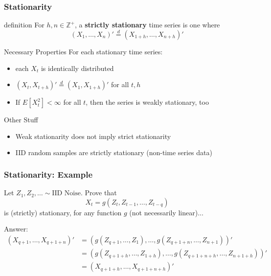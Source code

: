 \documentclass{beamer}
\begin{document}

\begin{frame}
\frametitle{Stationarity}

\begin{block}{definition}
For $h,n \in \mathbb{Z}^+$, a {\bf strictly stationary} time series is one where
\[
(X_1, \ldots, X_{n})' \overset{d}{=} (X_{1+h}, \ldots, X_{n+h})'
\]
\end{block}

\begin{block}{Necessary Properties}
For each stationary time series:
\begin{itemize}
\item each $X_t$ is identically distributed
\item $(X_t,X_{t+h})' \overset{d}{=} (X_1,X_{1+h})'$ for all $t,h$
\item If $E[X_t^2] < \infty$ for all $t$, then the series is weakly stationary, too
\end{itemize}
\end{block}

\begin{block}{Other Stuff}
\begin{itemize}
\item Weak stationarity does not imply strict stationarity
\item IID random samples are strictly stationary (non-time series data)
\end{itemize}
\end{block}



\end{frame}


\begin{frame}
\frametitle{Stationarity: Example}

Let $Z_1, Z_2, \ldots \sim \text{IID Noise}$. Prove that
\[
X_t = g(Z_t, Z_{t-1},\ldots, Z_{t-q})
\]
is (strictly) stationary, for any function $g$ (not necessarily linear)...
\newline
\pause

Answer:
\begin{align*}
(X_{q+1}, \ldots, X_{q+1+n})' &= (g(Z_{q+1},\ldots, Z_{1}), \ldots, g(Z_{q+1+n},\ldots, Z_{n+1}))'\\
&= (g(Z_{q+1+h},\ldots, Z_{1+h}), \ldots, g(Z_{q+1+n+h},\ldots, Z_{n+1+h}))' \\
&= (X_{q+1+h}, \ldots, X_{q+1+n+h})'
\end{align*}


\end{frame}
\end{document}
